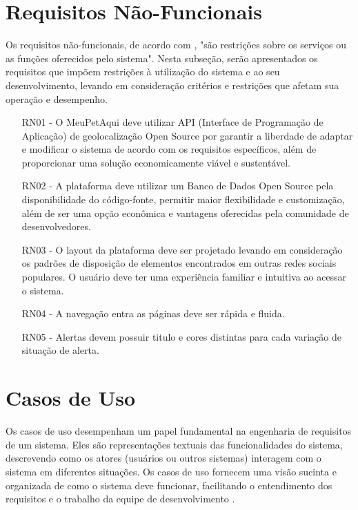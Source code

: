 \newpage
\section{Requisitos Não-Funcionais}
Os requisitos não-funcionais, de acordo com , "são restrições sobre os serviços ou as funções oferecidos pelo sistema". Nesta subseção, serão apresentados os requisitos que impõem restrições à utilização do sistema e ao seu desenvolvimento, levando em consideração critérios e restrições que afetam sua operação e desempenho.

\begin{itemize}[leftmargin=2cm]
  \item[RN01 -] O MeuPetAqui deve utilizar \gls{API} (Interface de Programação de Aplicação)  de geolocalização Open Source por garantir a liberdade de adaptar e modificar o sistema de acordo com os requisitos específicos, além de proporcionar uma solução economicamente viável e sustentável.
  \item[RN02 -] A plataforma deve utilizar um Banco de Dados Open Source pela disponibilidade do código-fonte, permitir maior flexibilidade e customização, além de ser uma opção econômica e vantagens oferecidas pela comunidade de desenvolvedores.
  \item[RN03 -] O layout da plataforma deve ser projetado levando em consideração os padrões de disposição de elementos encontrados em outras redes sociais populares. O usuário deve ter uma experiência familiar e intuitiva ao acessar o sistema.
  \item[RN04 -] A navegação entra as páginas deve ser rápida e fluida.
  \item[RN05 -] Alertas devem possuir titulo e cores distintas para cada variação de situação de alerta.
\end{itemize}

\newpage

\section{Casos de Uso}
Os casos de uso desempenham um papel fundamental na engenharia de requisitos de um sistema. Eles são representações textuais das funcionalidades do sistema, descrevendo como os atores (usuários ou outros sistemas) interagem com o sistema em diferentes situações. Os casos de uso fornecem uma visão sucinta e organizada de como o sistema deve funcionar, facilitando o entendimento dos requisitos e o trabalho da equipe de desenvolvimento \cite{Guedes}.

